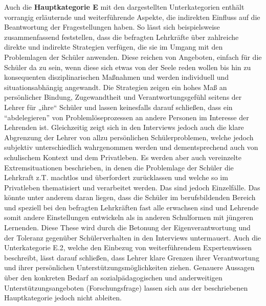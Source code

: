 \noindent
Auch die \textbf{Hauptkategorie E} mit den dargestellten Unterkategorien enthält vorrangig erläuternde und weiterführende Aspekte, die indirekten Einfluss auf die Beantwortung der Fragestellungen haben. So lässt sich beispielsweise zusammenfassend feststellen, dass die befragten Lehrkräfte über zahlreiche direkte und indirekte Strategien verfügen, die sie im Umgang mit den Problemlagen der Schüler anwenden. Diese reichen von Angeboten, einfach für die Schüler da zu sein, wenn diese sich etwas von der Seele reden wollen bis hin zu konsequenten disziplinarischen Maßnahmen und werden individuell und situationsabhängig angewandt. Die Strategien zeigen ein hohes Maß an persönlicher Bindung, Zugewandtheit und Verantwortungsgefühl seitens der Lehrer für „ihre“ Schüler und lassen 	keinesfalls darauf schließen, dass ein "`abdelegieren"' von Problemlöseprozessen an andere Personen im Interesse der Lehrenden ist. Gleichzeitig zeigt sich in den Interviews jedoch auch die klare Abgrenzung der Lehrer von allzu persönlichen Schülerproblemen, welche jedoch subjektiv unterschiedlich wahrgenommen werden und dementsprechend  auch von schulischem Kontext und dem Privatleben. Es werden aber auch vereinzelte Extremsituationen beschrieben, in denen die Problemlage der Schüler die Lehrkraft z.T. machtlos und überfordert zurücklassen und welche so im Privatleben thematisiert und verarbeitet werden. Das sind jedoch Einzelfälle. Das könnte unter anderem daran liegen, dass die Schüler im berufsbildenden Bereich und speziell bei den befragten Lehrkräften fast alle erwachsen sind und Lehrende somit andere Einstellungen entwickeln als in anderen Schulformen mit jüngeren Lernenden. Diese These wird durch die Betonung der Eigenverantwortung und der Toleranz gegenüber Schülerverhalten in den Interviews  untermauert. Auch die Unterkategorie E.2, welche den Einbezug von weiterführendem Expertenwissen beschreibt, lässt darauf schließen, dass Lehrer klare Grenzen ihrer Verantwortung und ihrer persönlichen Unterstützungsmöglichkeiten ziehen. Genauere Aussagen über den konkreten Bedarf an sozialpädagogischen und anderweitigen Unterstützungsangeboten (Forschungsfrage) lassen sich aus der beschriebenen Hauptkategorie jedoch nicht ableiten.\\

